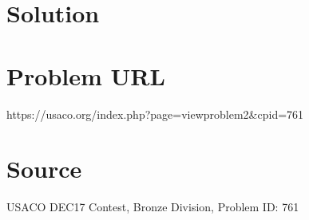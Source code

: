 \documentclass[12pt]{article}
\begin{document}
\section*{Solution}


\section*{Problem URL}
https://usaco.org/index.php?page=viewproblem2&cpid=761

\section*{Source}
USACO DEC17 Contest, Bronze Division, Problem ID: 761
\end{document}
